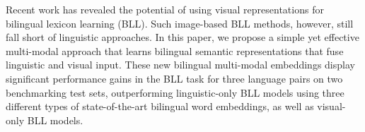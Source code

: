 Recent work has revealed the potential of using visual representations for bilingual lexicon learning (BLL). Such image-based BLL methods, however, still fall short of linguistic approaches. In this paper, we propose a simple yet effective multi-modal approach that learns bilingual semantic representations that fuse linguistic and visual input. These new bilingual multi-modal embeddings display significant performance gains in the BLL task for three language pairs on two benchmarking test sets, outperforming linguistic-only BLL models using three different types of state-of-the-art bilingual word embeddings, as well as visual-only BLL models.
